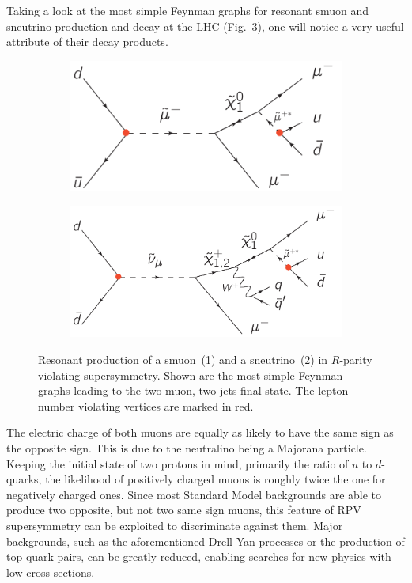 Taking a look at the most simple Feynman graphs for resonant smuon and sneutrino production and decay at the LHC (Fig.~\ref{fig:resosmusneu}), one will notice a very useful attribute of their decay products.

\begin{figure}[ht!]
  \centering
  \begin{subfigure}[b]{0.495\textwidth}
    \centering
    \includegraphics[width=\textwidth]{plots/rpv-resonant-smuon-samesign-mumuqq.pdf}
    \caption{\label{fig:ressmu}}
  \end{subfigure}
  \begin{subfigure}[b]{0.495\textwidth}
    \centering
    \includegraphics[width=\textwidth]{plots/rpv-resonant-sneutrino-chargino-mumuqq.pdf}
    \caption{\label{fig:ressneu}}
  \end{subfigure}
  \caption{Resonant production of a smuon~(\ref{fig:ressmu}) and a sneutrino~(\ref{fig:ressneu}) in $R$-parity violating supersymmetry. Shown are the most simple Feynman graphs leading to the two muon, two jets final state. The lepton number violating vertices are marked in red.}
  \label{fig:resosmusneu}
\end{figure}

\noindent The electric charge of both muons are equally as likely to have the same sign as the opposite sign. This is due to the neutralino being a Majorana particle. Keeping the initial state of two protons in mind, primarily the ratio of $u$ to $d$-quarks, the likelihood of positively charged muons is roughly twice the one for negatively charged ones. Since most Standard Model backgrounds are able to produce two opposite, but not two same sign muons, this feature of RPV supersymmetry can be exploited to discriminate against them. Major backgrounds, such as the aforementioned Drell-Yan processes or the production of top quark pairs, can be greatly reduced, enabling searches for new physics with low cross sections.


